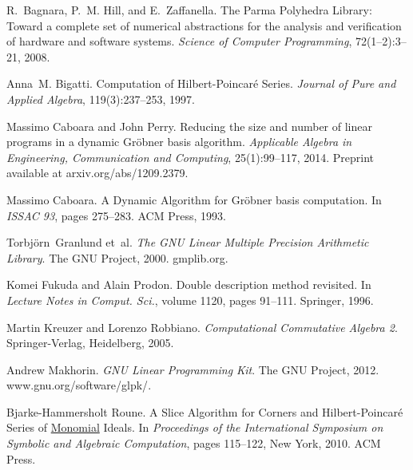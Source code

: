 
\begin{DoxyDescription}
\item[\label{_CITEREF_BagnaraHZ08SCP}%
\mbox{[}1\mbox{]}]R.~Bagnara, P.~M. Hill, and E.~Zaffanella. The Parma Polyhedra Library\+: Toward a complete set of numerical abstractions for the analysis and verification of hardware and software systems. {\itshape Science of Computer Programming}, 72(1--2)\+:3--21, 2008.


\item[\label{_CITEREF_Bigatti97}%
\mbox{[}2\mbox{]}]Anna~M. Bigatti. Computation of Hilbert-\/\+Poincar\'{e} Series. {\itshape Journal of Pure and Applied Algebra}, 119(3)\+:237--253, 1997.


\item[\label{_CITEREF_CaboaraPerry}%
\mbox{[}3\mbox{]}]Massimo Caboara and John Perry. Reducing the size and number of linear programs in a dynamic Gr\"{o}bner basis algorithm. {\itshape Applicable Algebra in Engineering, Communication and Computing}, 25(1)\+:99--117, 2014. Preprint available at {\ttfamily arxiv.\+org/abs/1209.2379}. 


\item[\label{_CITEREF_CaboaraDynAlg}%
\mbox{[}4\mbox{]}]Massimo Caboara. A Dynamic Algorithm for Gr\"{o}bner basis computation. In {\itshape I\+S\+S\+AC \textquotesingle{}93}, pages 275--283. A\+CM Press, 1993.


\item[\label{_CITEREF_gmp}%
\mbox{[}5\mbox{]}]Torbj\"{o}rn~Granlund et~al. {\itshape The G\+NU Linear Multiple Precision Arithmetic Library}. The G\+NU Project, 2000. {\ttfamily gmplib.\+org}.


\item[\label{_CITEREF_Fukuda_DoubleDescriptionRevisited}%
\mbox{[}6\mbox{]}]Komei Fukuda and Alain Prodon. Double description method revisited. In {\itshape Lecture Notes in Comput. Sci.}, volume 1120, pages 91--111. Springer, 1996.


\item[\label{_CITEREF_KR05}%
\mbox{[}7\mbox{]}]Martin Kreuzer and Lorenzo Robbiano. {\itshape Computational Commutative Algebra 2}. Springer-\/\+Verlag, Heidelberg, 2005.


\item[\label{_CITEREF_glpk}%
\mbox{[}8\mbox{]}]Andrew Makhorin. {\itshape G\+NU Linear Programming Kit}. The G\+NU Project, 2012. {\ttfamily www.\+gnu.\+org/software/glpk/}.


\item[\label{_CITEREF_RouneHilbert2010}%
\mbox{[}9\mbox{]}]Bjarke-\/\+Hammersholt Roune. A Slice Algorithm for Corners and Hilbert-\/\+Poincar\'{e} Series of \hyperlink{group__polygroup_class_monomial}{Monomial} Ideals. In {\itshape Proceedings of the International Symposium on Symbolic and Algebraic Computation}, pages 115--122, New York, 2010. A\+CM Press.



\end{DoxyDescription}
